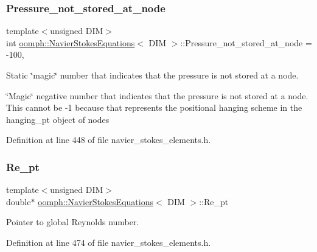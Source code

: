 \subsubsection{\texorpdfstring{Pressure\+\_\+not\+\_\+stored\+\_\+at\+\_\+node}{Pressure\_not\_stored\_at\_node}}
{\footnotesize\ttfamily template$<$unsigned D\+IM$>$ \\
int \hyperlink{classoomph_1_1NavierStokesEquations}{oomph\+::\+Navier\+Stokes\+Equations}$<$ D\+IM $>$\+::Pressure\+\_\+not\+\_\+stored\+\_\+at\+\_\+node = -\/100\hspace{0.3cm}{\ttfamily [static]}, {\ttfamily [private]}}



Static \char`\"{}magic\char`\"{} number that indicates that the pressure is not stored at a node. 

\char`\"{}\+Magic\char`\"{} negative number that indicates that the pressure is not stored at a node. This cannot be -\/1 because that represents the positional hanging scheme in the hanging\+\_\+pt object of nodes 

Definition at line 448 of file navier\+\_\+stokes\+\_\+elements.\+h.

\mbox{\label{classoomph_1_1NavierStokesEquations_a18ddee25e3db492aecb447cb1b8867a8}} 
\subsubsection{\texorpdfstring{Re\+\_\+pt}{Re\_pt}}
{\footnotesize\ttfamily template$<$unsigned D\+IM$>$ \\
double$\ast$ \hyperlink{classoomph_1_1NavierStokesEquations}{oomph\+::\+Navier\+Stokes\+Equations}$<$ D\+IM $>$\+::Re\+\_\+pt\hspace{0.3cm}{\ttfamily [protected]}}



Pointer to global Reynolds number. 



Definition at line 474 of file navier\+\_\+stokes\+\_\+elements.\+h.

\mbox{\label{classoomph_1_1NavierStokesEquations_ab09af9227732cacca090a4bd8c4be177}} 
